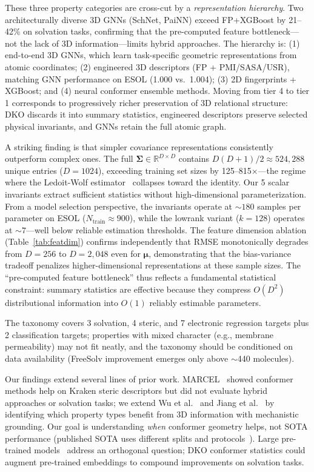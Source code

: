 \documentclass[sigconf]{acmart}
\newcommand{\rev}[1]{#1}
\begin{document}
\rev{These three property categories are cross-cut by a \emph{representation hierarchy}. Two architecturally diverse 3D GNNs (SchNet, PaiNN) exceed FP+XGBoost by 21--42\% on solvation tasks, confirming that the pre-computed feature bottleneck---not the lack of 3D information---limits hybrid approaches. The hierarchy is: (1) end-to-end 3D GNNs, which learn task-specific geometric representations from atomic coordinates; (2) engineered 3D descriptors (FP + PMI/SASA/USR), matching GNN performance on ESOL (1.000 vs.\ 1.004); (3) 2D fingerprints + XGBoost; and (4) neural conformer ensemble methods. Moving from tier 4 to tier 1 corresponds to progressively richer preservation of 3D relational structure: DKO discards it into summary statistics, engineered descriptors preserve selected physical invariants, and GNNs retain the full atomic graph.}

\rev{A striking finding is that} simpler covariance representations consistently outperform complex ones. The full $\boldsymbol{\Sigma} \in \mathbb{R}^{D \times D}$ contains $D(D+1)/2 \approx 524{,}288$ unique entries ($D{=}1024$), exceeding training set sizes by 125--815$\times$---the regime where the Ledoit-Wolf estimator~\cite{ledoit2004shrinkage} collapses toward the identity. Our 5 scalar invariants extract sufficient statistics without high-dimensional parameterization.
\rev{From a model selection perspective, the invariants operate at ${\sim}180$ samples per parameter on ESOL ($N_\text{train} \approx 900$), while the lowrank variant ($k{=}128$) operates at ${\sim}7$---well below reliable estimation thresholds. The feature dimension ablation (Table~\ref{tab:featdim}) confirms independently that RMSE monotonically degrades from $D{=}256$ to $D{=}2{,}048$ even for $\boldsymbol{\mu}$, demonstrating that the bias-variance tradeoff penalizes higher-dimensional representations at these sample sizes. The ``pre-computed feature bottleneck'' thus reflects a fundamental statistical constraint: summary statistics are effective because they compress $O(D^2)$ distributional information into $O(1)$ reliably estimable parameters.}

The taxonomy covers 3 solvation, 4 steric, and 7 electronic regression targets plus 2 classification targets; properties with mixed character (e.g., membrane permeability) may not fit neatly, and the taxonomy should be conditioned on data availability (FreeSolv improvement emerges only above ${\sim}$440 molecules).

\rev{Our findings extend several lines of prior work. MARCEL~\cite{axelrod2024marcel} showed conformer methods help on Kraken steric descriptors but did not evaluate hybrid approaches or solvation tasks; we extend Wu et al.~\cite{wu2018moleculenet} and Jiang et al.~\cite{jiang2021gnn_vs_fp} by identifying which property types benefit from 3D information with mechanistic grounding. Our goal is understanding \emph{when} conformer geometry helps, not SOTA performance (published SOTA uses different splits and protocols~\cite{heid2024chemprop,zhou2023unimol}). Large pre-trained models~\cite{zhou2023unimol,rong2020grover} address an orthogonal question; DKO conformer statistics could augment pre-trained embeddings to compound improvements on solvation tasks.}
\end{document}
